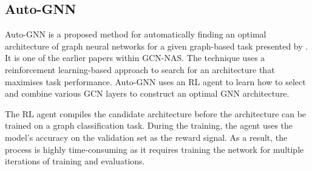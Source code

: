 \subsection{Auto-GNN}

\Gls{Auto-GNN} is a proposed method for automatically finding an optimal architecture of graph neural networks for a given graph-based task presented by \cite{zhou2019auto}. It is one of the earlier papers within \gls{GCN}-\gls{NAS}. The technique uses a reinforcement learning-based approach to search for an architecture that maximises task performance. \gls{Auto-GNN} uses an RL agent to learn how to select and combine various \gls{GCN} layers to construct an optimal \gls{GNN} architecture. 

The RL agent compiles the candidate architecture before the architecture can be trained on a graph classification task. During the training, the agent uses the model's accuracy on the validation set as the reward signal. As a result, the process is highly time-consuming as it requires training the network for multiple iterations of training and evaluations. 